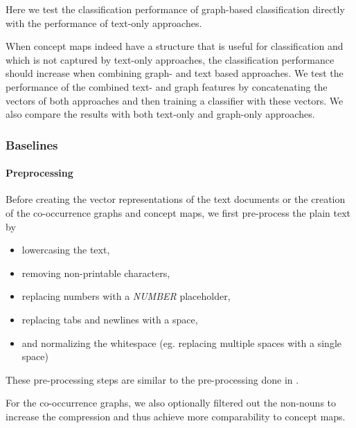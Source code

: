 Here we test the classification performance of graph-based classification directly with the performance of text-only approaches.


When concept maps indeed have a structure that is useful for classification and which is not captured by text-only approaches, the classification performance should increase when combining graph- and text based approaches.
We test the performance of the combined text- and graph features by concatenating the vectors of both approaches and then training a classifier with these vectors.
We also compare the results with both text-only and graph-only approaches.

\subsubsection{Baselines}
\paragraph{Preprocessing}
Before creating the vector representations of the text documents or the creation of the co-occurrence graphs and concept maps, we first pre-process the plain text by

\begin{itemize}
\item{lowercasing the text,}
\item{removing non-printable characters,}
\item{replacing numbers with a \textit{NUMBER} placeholder,}
\item{replacing tabs and newlines with a space,}
\item{and normalizing the whitespace (eg. replacing multiple spaces with a single space)}
\end{itemize}
These pre-processing steps are similar to the pre-processing done in \cite{Cachopo2007}.

For the co-occurrence graphs, we also optionally filtered out the non-nouns to increase the compression and thus achieve more comparability to concept maps.

